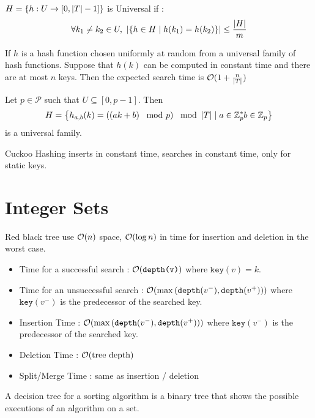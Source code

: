 \documentclass[10pt]{cours}
\begin{document}
$H = \left\{h : U \rightarrow \left[0, \left|T\right|-1\right]\right\}$ is Universal if :
\[
    \forall k_{1} \neq k_{2} \in U, \ \left|\left\{h \in H \mid h(k_{1}) = h(k_{2})\right\}\right| \leq \frac{\left|H\right|}{m}
\]

\begin{theorem}
    If $h$ is a hash function chosen uniformly at random from a universal family of hash functions. Suppose that $h(k)$ can be computed in constant time and there are at most $n$ keys. Then the expected search time is $\mathcal{O}(1 + \frac{n}{\left|T\right|})$
\end{theorem}
\begin{theorem}
    Let $p \in \mathcal{P}$ such that $U \subseteq \left[0, p-1\right]$. Then \[H = \left\{h_{a, b}(k) = \left(\left(ak + b\right) \mod p\right) \mod \abs{T} \mid a \in \Z_{p}^{*} b \in \Z_{p} \right\}\] is a universal family.
\end{theorem}

\begin{theorem}
    Cuckoo Hashing inserts in constant time, searches in constant time, only for static keys.
\end{theorem}

\section{Integer Sets}
\begin{proposition}[RBTrees]
    Red black tree use $\mathcal{O}(n)$ space, $\mathcal{O}(\log n)$ in time for insertion and deletion in the worst case. %
\end{proposition}
\begin{proposition}[Treaps]
    \begin{itemize}
        \item Time for a successful search : $\mathcal{O}(\texttt{depth(v)})$ where $\texttt{key}(v) = k$.
        \item Time for an unsuccessful search : $\mathcal{O}(\max \left(\texttt{depth}(v^{-}), \texttt{depth}(v^{+})\right))$ where $\texttt{key}(v^{-})$ is the predecessor of the searched key.
        \item Insertion Time : $\mathcal{O}(\max \left(\texttt{depth}(v^{-}), \texttt{depth}(v^{+})\right))$ where $\texttt{key}(v^{-})$ is the predecessor of the searched key.
        \item Deletion Time : $\mathcal{O}(\text{tree depth})$
        \item Split/Merge Time : same as insertion / deletion
    \end{itemize}
\end{proposition}
\begin{definition}
    A decision tree for a sorting algorithm is a binary tree that shows the possible executions of an algorithm on a set.
\end{definition}
\end{document}
